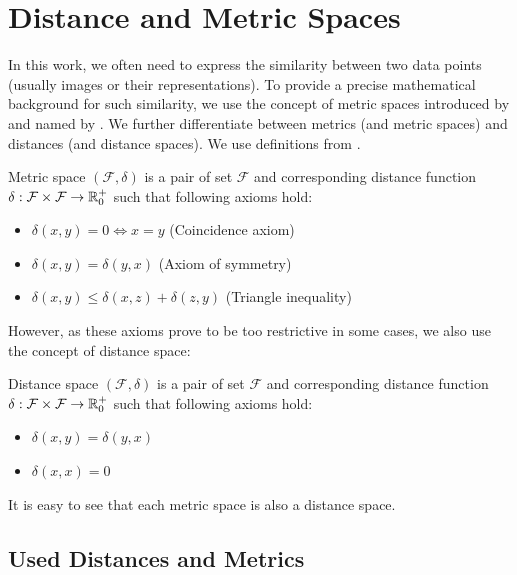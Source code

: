 \section{Distance and Metric Spaces}
\label{sec:distances}

In this work, we often need to express the similarity between two data points (usually images or their representations). To provide a precise mathematical background for such similarity, we use the concept of metric spaces introduced by \cite{metric} and named by \cite{metricname}. We further differentiate between metrics (and metric spaces) and distances (and distance spaces). We use definitions from \cite{deza2009encyclopedia}.

\begin{defn}
Metric space $(\mathcal{F}, \delta)$ is a pair of set $\mathcal{F}$ and
corresponding distance function
$\delta : \mathcal{F} \times \mathcal{F} \rightarrow \mathbb{R}_0^+$ such that
following axioms hold:
\begin{itemize}
    \item $\delta(x, y) = 0 \Leftrightarrow x = y$ (Coincidence axiom)
    \item $\delta(x, y) = \delta(y, x)$ (Axiom of symmetry)
    \item $\delta(x, y) \leq \delta(x, z) + \delta(z, y)$ (Triangle inequality)
\end{itemize}
\end{defn}%

However, as these axioms prove to be too restrictive in some cases, we also use the concept of distance space:
\begin{defn}
Distance space $(\mathcal{F}, \delta)$ is a pair of set $\mathcal{F}$ and
corresponding distance function $\delta : \mathcal{F} \times \mathcal{F} \rightarrow \mathbb{R}_0^+$ such that
following axioms hold:
\begin{itemize}
    \item $\delta(x, y) = \delta(y, x)$
    \item $\delta(x, x) = 0$
\end{itemize}
\end{defn}%
It is easy to see that each metric space is also a distance space.

\subsection{Used Distances and Metrics}

\label{ssec:used_distances}

